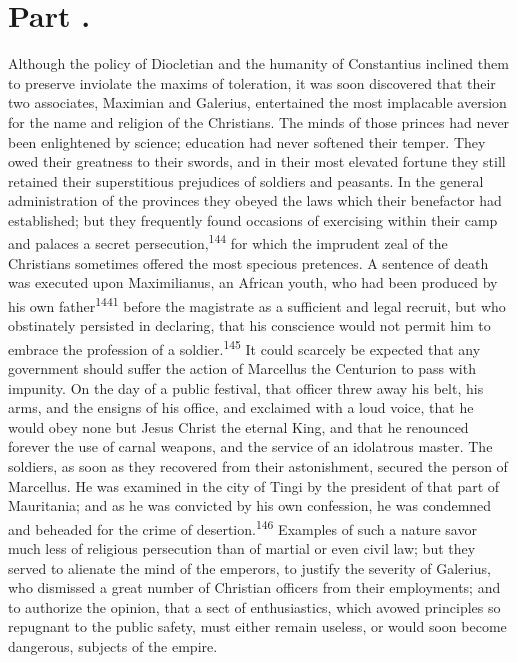 
\section{Part \thesection.}

Although the policy of Diocletian and the humanity of Constantius
inclined them to preserve inviolate the maxims of toleration, it
was soon discovered that their two associates, Maximian and
Galerius, entertained the most implacable aversion for the name
and religion of the Christians. The minds of those princes had
never been enlightened by science; education had never softened
their temper. They owed their greatness to their swords, and in
their most elevated fortune they still retained their
superstitious prejudices of soldiers and peasants. In the general
administration of the provinces they obeyed the laws which their
benefactor had established; but they frequently found occasions
of exercising within their camp and palaces a secret persecution,\textsuperscript{144}
for which the imprudent zeal of the Christians sometimes
offered the most specious pretences. A sentence of death was
executed upon Maximilianus, an African youth, who had been
produced by his own father\textsuperscript{1441} before the magistrate as a
sufficient and legal recruit, but who obstinately persisted in
declaring, that his conscience would not permit him to embrace
the profession of a soldier.\textsuperscript{145} It could scarcely be expected
that any government should suffer the action of Marcellus the
Centurion to pass with impunity. On the day of a public festival,
that officer threw away his belt, his arms, and the ensigns of
his office, and exclaimed with a loud voice, that he would obey
none but Jesus Christ the eternal King, and that he renounced
forever the use of carnal weapons, and the service of an
idolatrous master. The soldiers, as soon as they recovered from
their astonishment, secured the person of Marcellus. He was
examined in the city of Tingi by the president of that part of
Mauritania; and as he was convicted by his own confession, he was
condemned and beheaded for the crime of desertion.\textsuperscript{146} Examples
of such a nature savor much less of religious persecution than of
martial or even civil law; but they served to alienate the mind
of the emperors, to justify the severity of Galerius, who
dismissed a great number of Christian officers from their
employments; and to authorize the opinion, that a sect of
enthusiastics, which avowed principles so repugnant to the public
safety, must either remain useless, or would soon become
dangerous, subjects of the empire.

